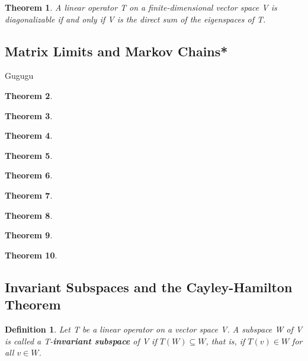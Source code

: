 \documentclass{article}
\newcommand{\bd}[1]{\textbf{#1}}
\theoremstyle{plain}
\newtheorem{theorem}{Theorem}[section]
\newtheorem*{definition1}{Definition}
\theoremstyle{plain} %
\begin{document}
\begin{theorem}
  A linear operator T on a finite-dimensional vector space V is diagonalizable if and only if V is the direct sum of the eigenspaces of T.
\end{theorem}

\subsection {Matrix Limits and Markov Chains*}

Gugugu

\begin{theorem}
\end{theorem}

\begin{theorem}
\end{theorem}

\begin{theorem}
\end{theorem}

\begin{theorem}
\end{theorem}

\begin{theorem}
\end{theorem}

\begin{theorem}
\end{theorem}

\begin{theorem}
\end{theorem}

\begin{theorem}
\end{theorem}

\begin{theorem}
\end{theorem}

\subsection {Invariant Subspaces and the Cayley-Hamilton Theorem}

\begin{definition1}
  Let T be a linear operator on a vector space V. A subspace W of V is called a T-\bd{invariant  subspace} of V if $T(W) \subseteq W$, that is, if $T(v) \in W$ for all $v \in W$.
\end{definition1}
\end{document}
